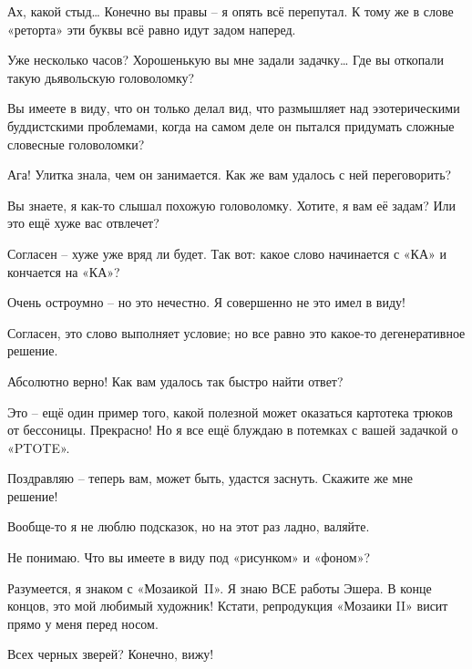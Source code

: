 \documentclass[../main.tex]{subfiles}
\begin{document}
\begin{dialogue}
 Ах, какой стыд\ldots{} Конечно вы правы \--- я опять всё перепутал. К тому же в слове «реторта» эти буквы всё равно идут задом наперед.

 Уже несколько часов? Хорошенькую вы мне задали задачку\ldots{} Где вы откопали такую дьявольскую головоломку?

 Вы имеете в виду, что он только делал вид, что размышляет над эзотерическими буддистскими проблемами, когда на самом деле он пытался придумать сложные словесные головоломки?

 Ага! Улитка знала, чем он занимается. Как же вам удалось с ней переговорить?

 Вы знаете, я как-то слышал похожую головоломку. Хотите, я вам её задам? Или это ещё хуже вас отвлечет?

 Согласен \--- хуже уже вряд ли будет. Так вот: какое слово начинается с «КА» и кончается на «КА»?

 Очень остроумно \--- но это нечестно. Я совершенно не это имел в виду!

 Согласен, это слово выполняет условие; но все равно это какое-то дегенеративное решение.

 Абсолютно верно! Как вам удалось так быстро найти ответ?

 Это \--- ещё один пример того, какой полезной может оказаться картотека трюков от бессоницы. Прекрасно! Но я все ещё блуждаю в потемках с вашей задачкой о «PTOTE».

 Поздравляю \--- теперь вам, может быть, удастся заснуть. Скажите же мне решение!

 Вообще-то я не люблю подсказок, но на этот раз ладно, валяйте.

 Не понимаю. Что вы имеете в виду под «рисунком» и «фоном»?


 Разумеется, я знаком с «Мозаикой~II». Я знаю ВСЕ работы Эшера. В конце концов, это мой любимый художник! Кстати, репродукция «Мозаики II» висит прямо у меня перед носом.

 Всех черных зверей? Конечно, вижу!


\end{dialogue}
\end{document}
